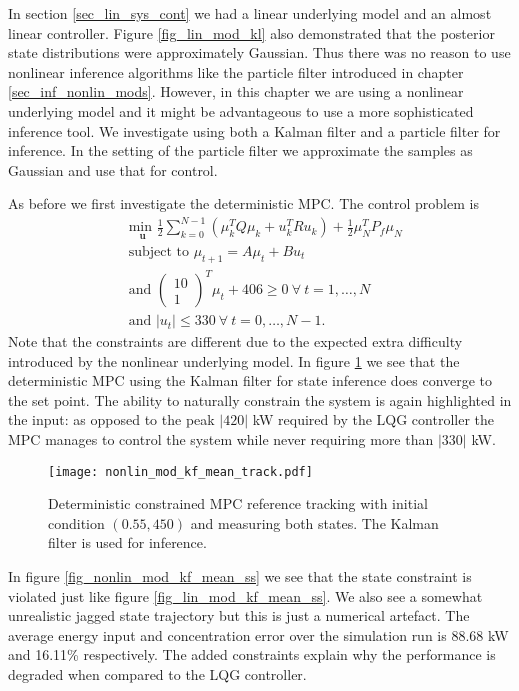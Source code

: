 In section \ref{sec_lin_sys_cont} we had a linear underlying model and an almost linear controller. Figure \ref{fig_lin_mod_kl} also demonstrated that the posterior state distributions were approximately Gaussian. Thus there was no reason to use nonlinear inference algorithms like the particle filter introduced in chapter \ref{sec_inf_nonlin_mods}. However, in this chapter we are using a nonlinear underlying model and it might be advantageous to use a more sophisticated inference tool. We investigate using both a Kalman filter and a particle filter for inference. In the setting of the particle filter we approximate the samples as Gaussian and use that for control.

As before we first investigate the deterministic MPC. The control problem is  
\begin{equation}
\begin{aligned}
&\underset{\mathbf{u}}{\text{min }} \frac{1}{2}\sum_{k=0}^{N-1} \left( \mu_k^TQ\mu_k + u_k^TRu_k \right) + \frac{1}{2}\mu_N^TP_f\mu_N \\
& \text{subject to } \mu_{t+1}=A\mu_t + Bu_t \\
&\text{and } \begin{pmatrix}
10 \\ 1
\end{pmatrix}^T \mu_t + 406 \geq 0 ~\forall ~t=1,\hdots,N\\
& \text{and } |u_t| \leq 330 ~\forall ~t=0,\hdots,N-1.
\end{aligned}
\label{eq_mpc_constrained_det2}
\end{equation}
Note that the constraints are different due to the expected extra difficulty introduced by the nonlinear underlying model. In figure \ref{fig_nonlin_mod_kf_mean_track} we see that the deterministic MPC using the Kalman filter for state inference does converge to the set point. The ability to naturally constrain the system is again highlighted in the input: as opposed to the peak $|420|$ kW required by the LQG controller the MPC manages to control the system while never requiring more than $|330|$ kW. 
\begin{figure}[H] 
\centering
\texttt{[image: nonlin\_mod\_kf\_mean\_track.pdf]}
\caption{Deterministic constrained MPC reference tracking with initial condition $(0.55, 450)$ and measuring both states. The Kalman filter is used for inference.}
\label{fig_nonlin_mod_kf_mean_track}
\end{figure} 
In figure \ref{fig_nonlin_mod_kf_mean_ss} we see that the state constraint is violated just like figure \ref{fig_lin_mod_kf_mean_ss}. We also see a somewhat unrealistic jagged state trajectory but this is just a numerical artefact. The average energy input and concentration error over the simulation run is 88.68 kW and 16.11\% respectively. The added constraints explain why the performance is degraded when compared to the LQG controller.
